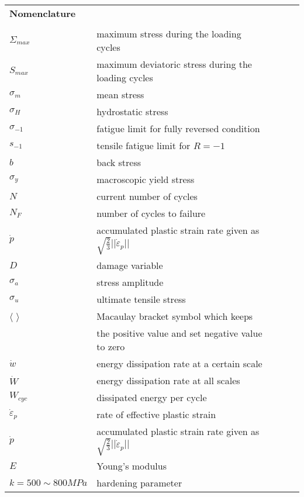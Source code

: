 \begin{flushleft}
	\begin{table}[!h]
		\begin{tabular}{lllll}
			\textbf{Nomenclature}& &  &  &  \\
			& &  &  &  \\
			$\Sigma_{max}$ & maximum stress during the loading cycles &  &  &  \\
			$S_{max}$ & maximum deviatoric stress during the loading cycles &  &  &  \\
			$\sigma_m$ & mean stress &  &  &  \\
			$\sigma_H$ & hydrostatic stress &  &  &  \\
			$\sigma_{-1}$ & fatigue limit for fully reversed condition  &  &  &  \\
			$s_{-1}$& tensile fatigue limit for $R=-1$  &  &  &  \\
			$b$ & back stress  &  &  &  \\
			$\sigma_{y}$ & macroscopic yield stress &  &  &  \\
			$N$& current number of cycles &  &  &  \\
			$N_F$& number of cycles to failure &  &  &  \\
			$\dot{p}$ & accumulated plastic strain rate given as $\sqrt{\frac{2}{3}}||\dot{\varepsilon}_p||$ &  &  &  \\
			$D$ & damage variable  &  &  &  \\
			$\sigma_{a}$ & stress amplitude &  &  &  \\
			$\sigma_{u}$ & ultimate tensile stress &  &  &  \\
			$\langle$ $\rangle$& Macaulay bracket symbol which keeps &  &  &  \\
				                  & the positive value and set negative value to zero&  &  &  \\
			$\dot{w}$ & energy dissipation rate at a certain scale &  &  &  \\
			$\dot{W}$ & energy dissipation rate at all scales &  &  &  \\
			$W_{cyc}$ & dissipated energy per cycle &  &  &  \\
			$ \dot{\varepsilon}_p$ & rate of effective plastic strain &  &  &  \\
			$\dot{p}$ & accumulated plastic strain rate given as $\sqrt{\frac{2}{3}}||\dot{\varepsilon}_p||$ &  &  &  \\
			$E$ & Young's modulus &  &  &  \\
			$k=500\sim800MPa$ & hardening parameter &  &  &  \\

\end{tabular}
\end{table}
\end{flushleft}
